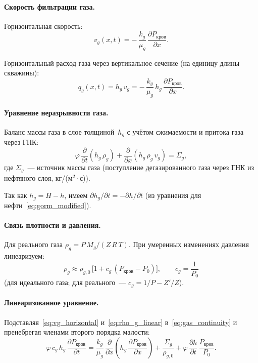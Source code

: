 \documentclass[12pt,a4paper]{article}
\begin{document}
\paragraph{Скорость фильтрации газа.}
Горизонтальная скорость:
\begin{equation}\label{eq:vg_horizontal}
  v_g(x,t) = -\,\frac{k_g}{\mu_g}\,
              \frac{\partial P_{\text{кров}}}{\partial x}.
\end{equation}

Горизонтальный расход газа через вертикальное сечение (на единицу
длины скважины):
\begin{equation}\label{eq:qg_horizontal}
  q_g(x,t) = h_g\,v_g
    = -\,\frac{k_g}{\mu_g}\,h_g\,
      \frac{\partial P_{\text{кров}}}{\partial x}.
\end{equation}

\paragraph{Уравнение неразрывности газа.}
Баланс массы газа в слое толщиной~$h_g$ с учётом сжимаемости
и притока газа через ГНК:
\begin{equation}\label{eq:gas_continuity}
  \varphi\,\frac{\partial}{\partial t}(h_g\,\rho_g)
  + \frac{\partial}{\partial x}(h_g\,\rho_g\,v_g) = \Sigma_g,
\end{equation}
где $\Sigma_g$~--- источник массы газа (поступление дегазированного газа
через ГНК из нефтяного слоя, кг/(м$^2\cdot$с)).

Так как $h_g = H - h$, имеем $\partial h_g/\partial t = -\partial h/\partial t$
(из уравнения для нефти~\eqref{eq:gorm_modified}).

\paragraph{Связь плотности и давления.}
Для реального газа $\rho_g = P\,M_g/(Z\,R\,T)$. При умеренных
изменениях давления линеаризуем:
\begin{equation}\label{eq:rho_g_linear}
  \rho_g \approx \rho_{g,0}\,
    \bigl[1 + c_g\,(P_{\text{кров}} - P_0)\bigr],
  \qquad c_g = \frac{1}{P_0}
\end{equation}
(для идеального газа; для реального~--- $c_g = 1/P - Z'/Z$).

\paragraph{Линеаризованное уравнение.}
Подставляя~\eqref{eq:vg_horizontal} и~\eqref{eq:rho_g_linear}
в~\eqref{eq:gas_continuity} и пренебрегая членами второго порядка
малости:
\begin{equation}\label{eq:gas_PDE}
  \boxed{\;
    \varphi\,c_g\,h_g\,\frac{\partial P_{\text{кров}}}{\partial t}
    = \frac{k_g}{\mu_g}\,\frac{\partial}{\partial x}
      \left(h_g\,\frac{\partial P_{\text{кров}}}{\partial x}\right)
    + \frac{\Sigma_g}{\rho_{g,0}}
    + \varphi\,\frac{\partial h}{\partial t}\,
      \frac{P_{\text{кров}}}{P_0}.
  \;}
\end{equation}
\end{document}
